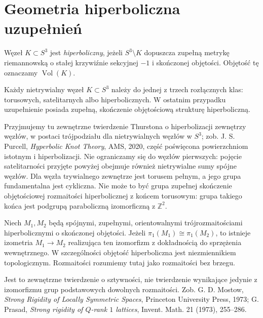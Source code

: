 \section{Geometria hiperboliczna uzupełnień}
\label{sec:kt-hyperbolic}

\begin{definicja}
Węzeł $K\subset S^3$ jest \emph{hiperboliczny}, jeżeli
$S^3\setminus K$ dopuszcza zupełną metrykę riemannowską
o stałej krzywiźnie sekcyjnej $-1$ i skończonej objętości.
Objętość tę oznaczamy $\operatorname{Vol}(K)$.
\end{definicja}

\begin{twierdzenie}
Każdy nietrywialny węzeł $K\subset S^3$ należy do jednej
z trzech rozłącznych klas: torusowych, satelitarnych albo
hiperbolicznych. W ostatnim przypadku uzupełnienie posiada
zupełną, skończenie objętościową strukturę hiperboliczną.
\end{twierdzenie}

\begin{uwaga}
Przyjmujemy tu zewnętrzne twierdzenie Thurstona
o hiperbolizacji zewnętrzy węzłów, w postaci trójpodziału
dla nietrywialnych węzłów w $S^3$; zob. J. S. Purcell,
\emph{Hyperbolic Knot Theory}, AMS, 2020, część
poświęcona powierzchniom istotnym i hiperbolizacji.
Nie ograniczamy się do węzłów pierwszych: pojęcie
satelitarności przyjęte powyżej obejmuje również
nietrywialne sumy spójne węzłów.
Dla węzła trywialnego zewnętrze jest torusem pełnym,
a jego grupa fundamentalna jest cykliczna. Nie może to
być grupa zupełnej skończenie objętościowej rozmaitości
hiperbolicznej z końcem torusowym: grupa takiego końca
jest podgrupą paraboliczną izomorficzną z $\mathbb Z^2$.
\end{uwaga}

\begin{twierdzenie}
Niech $M_1,M_2$ będą spójnymi, zupełnymi, orientowalnymi
trójrozmaitościami hiperbolicznymi o skończonej objętości.
Jeżeli $\pi_1(M_1)\cong\pi_1(M_2)$, to istnieje izometria
$M_1\to M_2$ realizująca ten izomorfizm z dokładnością
do sprzężenia wewnętrznego. W szczególności objętość
hiperboliczna jest niezmiennikiem topologicznym.
Rozmaitości rozumiemy tutaj jako rozmaitości bez brzegu.
\end{twierdzenie}

\begin{uwaga}
Jest to zewnętrzne twierdzenie o sztywności, nie
twierdzenie wynikające jedynie z izomorfizmu grup
podstawowych dowolnych rozmaitości. Zob. G. D. Mostow,
\emph{Strong Rigidity of Locally Symmetric Spaces},
Princeton University Press, 1973; G. Prasad,
\emph{Strong rigidity of $Q$-rank $1$ lattices},
Invent. Math. 21 (1973), 255--286.
\end{uwaga}

